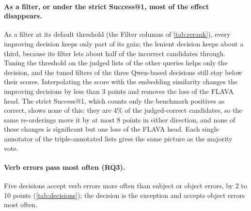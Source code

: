 \paragraph{As a filter, or under the strict Success@1, most of the effect disappears.}
As a filter at its default threshold (the Filter columns of \cref{tab:rerank}), every improving decision keeps only part of its gain; the lenient \qemb{} decision keeps about a third, because its filter lets about half of the incorrect candidates through. Tuning the threshold on the judged lists of the other queries helps only the \qemb{} decision, and the tuned filters of the three Qwen-based decisions still stay below their scores. Interpolating the score with the embedding similarity changes the improving decisions by less than 3 points and removes the loss of the FLAVA head. The strict Success@1, which counts only the benchmark positives as correct, shows none of this: they are 4\% of the judged-correct candidates, so the same re-orderings move it by at most 8 points in either direction, and none of these changes is significant but one loss of the FLAVA head. Each single annotator of the triple-annotated lists gives the same picture as the majority vote.
\paragraph{Verb errors pass most often (RQ3).}
Five decisions accept verb errors more often than subject or object errors, by 2 to 10 points (\cref{tab:decisions}); the \qemb{} decision is the exception and accepts object errors most often.
